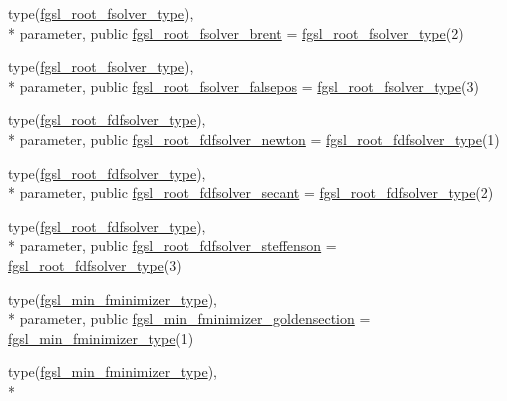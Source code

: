 \begin{DoxyCompactItemize}
\item 
type(\hyperlink{structfgsl_1_1fgsl__root__fsolver__type}{fgsl\-\_\-root\-\_\-fsolver\-\_\-type}), \\*
parameter, public \hyperlink{classfgsl_a097401e95907837ed18233ae594898d2}{fgsl\-\_\-root\-\_\-fsolver\-\_\-brent} = \hyperlink{structfgsl_1_1fgsl__root__fsolver__type}{fgsl\-\_\-root\-\_\-fsolver\-\_\-type}(2)
\item 
type(\hyperlink{structfgsl_1_1fgsl__root__fsolver__type}{fgsl\-\_\-root\-\_\-fsolver\-\_\-type}), \\*
parameter, public \hyperlink{classfgsl_ac71356c84267ed5e1dba5501be28b428}{fgsl\-\_\-root\-\_\-fsolver\-\_\-falsepos} = \hyperlink{structfgsl_1_1fgsl__root__fsolver__type}{fgsl\-\_\-root\-\_\-fsolver\-\_\-type}(3)
\item 
type(\hyperlink{structfgsl_1_1fgsl__root__fdfsolver__type}{fgsl\-\_\-root\-\_\-fdfsolver\-\_\-type}), \\*
parameter, public \hyperlink{classfgsl_aa05053ddddf728c909cfa5bed48b65dc}{fgsl\-\_\-root\-\_\-fdfsolver\-\_\-newton} = \hyperlink{structfgsl_1_1fgsl__root__fdfsolver__type}{fgsl\-\_\-root\-\_\-fdfsolver\-\_\-type}(1)
\item 
type(\hyperlink{structfgsl_1_1fgsl__root__fdfsolver__type}{fgsl\-\_\-root\-\_\-fdfsolver\-\_\-type}), \\*
parameter, public \hyperlink{classfgsl_a52cb2fcd33e5ad5b7bf7303a8b47764a}{fgsl\-\_\-root\-\_\-fdfsolver\-\_\-secant} = \hyperlink{structfgsl_1_1fgsl__root__fdfsolver__type}{fgsl\-\_\-root\-\_\-fdfsolver\-\_\-type}(2)
\item 
type(\hyperlink{structfgsl_1_1fgsl__root__fdfsolver__type}{fgsl\-\_\-root\-\_\-fdfsolver\-\_\-type}), \\*
parameter, public \hyperlink{classfgsl_aca4a5d84619cc9678ec442a1f33741aa}{fgsl\-\_\-root\-\_\-fdfsolver\-\_\-steffenson} = \hyperlink{structfgsl_1_1fgsl__root__fdfsolver__type}{fgsl\-\_\-root\-\_\-fdfsolver\-\_\-type}(3)
\item 
type(\hyperlink{structfgsl_1_1fgsl__min__fminimizer__type}{fgsl\-\_\-min\-\_\-fminimizer\-\_\-type}), \\*
parameter, public \hyperlink{classfgsl_a372d8c5ea330e874febcdaf090c8f8fc}{fgsl\-\_\-min\-\_\-fminimizer\-\_\-goldensection} = \hyperlink{structfgsl_1_1fgsl__min__fminimizer__type}{fgsl\-\_\-min\-\_\-fminimizer\-\_\-type}(1)
\item 
type(\hyperlink{structfgsl_1_1fgsl__min__fminimizer__type}{fgsl\-\_\-min\-\_\-fminimizer\-\_\-type}), \\*

\end{DoxyCompactItemize}
